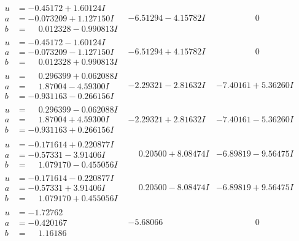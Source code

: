 \documentclass[1p]{elsarticle_modified}
\theoremstyle{definition}
\begin{document}
$$\begin{array}{c|c|c}
\begin{aligned}
u &= -0.45172 + 1.60124 I \\
a &= -0.073209 + 1.127150 I \\
b &= \phantom{-}0.012328 - 0.990813 I\end{aligned}
 & -6.51294 - 4.15782 I & \phantom{-0.000000 } 0 \\ \hline\begin{aligned}
u &= -0.45172 - 1.60124 I \\
a &= -0.073209 - 1.127150 I \\
b &= \phantom{-}0.012328 + 0.990813 I\end{aligned}
 & -6.51294 + 4.15782 I & \phantom{-0.000000 } 0 \\ \hline\begin{aligned}
u &= \phantom{-}0.296399 + 0.062088 I \\
a &= \phantom{-}1.87004 - 4.59300 I \\
b &= -0.931163 - 0.266156 I\end{aligned}
 & -2.29321 - 2.81632 I & -7.40161 + 5.36260 I \\ \hline\begin{aligned}
u &= \phantom{-}0.296399 - 0.062088 I \\
a &= \phantom{-}1.87004 + 4.59300 I \\
b &= -0.931163 + 0.266156 I\end{aligned}
 & -2.29321 + 2.81632 I & -7.40161 - 5.36260 I \\ \hline\begin{aligned}
u &= -0.171614 + 0.220877 I \\
a &= -0.57331 - 3.91406 I \\
b &= \phantom{-}1.079170 - 0.455056 I\end{aligned}
 & \phantom{-}0.20500 + 8.08474 I & -6.89819 - 9.56475 I \\ \hline\begin{aligned}
u &= -0.171614 - 0.220877 I \\
a &= -0.57331 + 3.91406 I \\
b &= \phantom{-}1.079170 + 0.455056 I\end{aligned}
 & \phantom{-}0.20500 - 8.08474 I & -6.89819 + 9.56475 I \\ \hline\begin{aligned}
u &= -1.72762\phantom{ +0.000000I} \\
a &= -0.420167\phantom{ +0.000000I} \\
b &= \phantom{-}1.16186\phantom{ +0.000000I}\end{aligned}
 & -5.68066\phantom{ +0.000000I} & \phantom{-0.000000 } 0 \\ \hline\begin{aligned}

\end{aligned}
\end{array}$$
\end{document}
